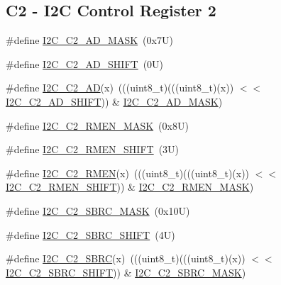 \subsection*{C2 -\/ I2C Control Register 2}
\begin{DoxyCompactItemize}
\item 
\#define \mbox{\hyperlink{group___i2_c___register___masks_ga6c5f8db3bac4c51de9446448a8ad9072}{I2\+C\+\_\+\+C2\+\_\+\+A\+D\+\_\+\+M\+A\+SK}}~(0x7\+U)
\item 
\#define \mbox{\hyperlink{group___i2_c___register___masks_gab875d484e12dc6ae427c2063430d1362}{I2\+C\+\_\+\+C2\+\_\+\+A\+D\+\_\+\+S\+H\+I\+FT}}~(0\+U)
\item 
\#define \mbox{\hyperlink{group___i2_c___register___masks_gaa19edf20551c0d4dc70b840c2c5b7e24}{I2\+C\+\_\+\+C2\+\_\+\+AD}}(x)~(((uint8\+\_\+t)(((uint8\+\_\+t)(x)) $<$$<$ \mbox{\hyperlink{group___i2_c___register___masks_gab875d484e12dc6ae427c2063430d1362}{I2\+C\+\_\+\+C2\+\_\+\+A\+D\+\_\+\+S\+H\+I\+FT}})) \& \mbox{\hyperlink{group___i2_c___register___masks_ga6c5f8db3bac4c51de9446448a8ad9072}{I2\+C\+\_\+\+C2\+\_\+\+A\+D\+\_\+\+M\+A\+SK}})
\item 
\#define \mbox{\hyperlink{group___i2_c___register___masks_ga70911373d5619a4d8376777446085856}{I2\+C\+\_\+\+C2\+\_\+\+R\+M\+E\+N\+\_\+\+M\+A\+SK}}~(0x8\+U)
\item 
\#define \mbox{\hyperlink{group___i2_c___register___masks_ga802a10e2d279895ec0230b4701b1a4bf}{I2\+C\+\_\+\+C2\+\_\+\+R\+M\+E\+N\+\_\+\+S\+H\+I\+FT}}~(3\+U)
\item 
\#define \mbox{\hyperlink{group___i2_c___register___masks_gaecaecedb471207c255fe346e6158cdef}{I2\+C\+\_\+\+C2\+\_\+\+R\+M\+EN}}(x)~(((uint8\+\_\+t)(((uint8\+\_\+t)(x)) $<$$<$ \mbox{\hyperlink{group___i2_c___register___masks_ga802a10e2d279895ec0230b4701b1a4bf}{I2\+C\+\_\+\+C2\+\_\+\+R\+M\+E\+N\+\_\+\+S\+H\+I\+FT}})) \& \mbox{\hyperlink{group___i2_c___register___masks_ga70911373d5619a4d8376777446085856}{I2\+C\+\_\+\+C2\+\_\+\+R\+M\+E\+N\+\_\+\+M\+A\+SK}})
\item 
\#define \mbox{\hyperlink{group___i2_c___register___masks_gad5acb46182264a92f1f7ca818146d44e}{I2\+C\+\_\+\+C2\+\_\+\+S\+B\+R\+C\+\_\+\+M\+A\+SK}}~(0x10\+U)
\item 
\#define \mbox{\hyperlink{group___i2_c___register___masks_ga620079dc18e7ce504b6092503a10d2ae}{I2\+C\+\_\+\+C2\+\_\+\+S\+B\+R\+C\+\_\+\+S\+H\+I\+FT}}~(4\+U)
\item 
\#define \mbox{\hyperlink{group___i2_c___register___masks_ga7ca1ec1871481fc75fb503d94403e577}{I2\+C\+\_\+\+C2\+\_\+\+S\+B\+RC}}(x)~(((uint8\+\_\+t)(((uint8\+\_\+t)(x)) $<$$<$ \mbox{\hyperlink{group___i2_c___register___masks_ga620079dc18e7ce504b6092503a10d2ae}{I2\+C\+\_\+\+C2\+\_\+\+S\+B\+R\+C\+\_\+\+S\+H\+I\+FT}})) \& \mbox{\hyperlink{group___i2_c___register___masks_gad5acb46182264a92f1f7ca818146d44e}{I2\+C\+\_\+\+C2\+\_\+\+S\+B\+R\+C\+\_\+\+M\+A\+SK}})
$$
\end{DoxyCompactItemize}
